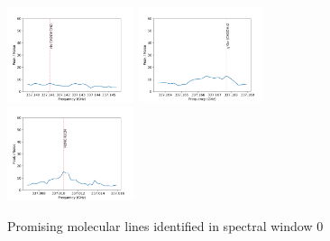 \documentclass{aa}
\begin{document}
\begin{figure}
    \includegraphics[width=0.33\textwidth]{spw0_cis-CH2OHCHO}
    \includegraphics[width=0.33\textwidth]{spw0_g'Ga-(CH2OH)2}
    \includegraphics[width=0.33\textwidth]{spw0_H2NCH2CN}
    \caption{Promising molecular lines identified in spectral window 0}
   \end{figure}
\end{document}
